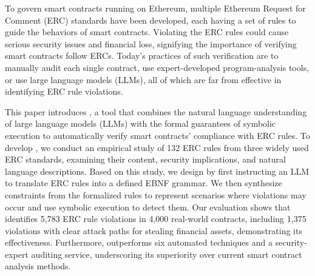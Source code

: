 
To govern smart contracts running on Ethereum, 
multiple Ethereum Request for Comment (ERC) standards have been developed, 
each having a set of rules to guide 
the behaviors of smart contracts. 
Violating the ERC rules could cause serious security issues 
and financial loss, 
signifying the importance of verifying 
smart contracts follow ERCs. 
Today's practices of such verification are to manually audit each single contract, 
use expert-developed program-analysis tools, or use large language models (LLMs), all of which are far from effective in identifying ERC rule violations.

This paper introduces \emph{\Tool{}}, 
a tool that combines the natural language understanding of large language models (LLMs) 
with the formal guarantees of symbolic execution to automatically 
verify smart contracts' compliance with ERC rules. To develop \Tool{}, 
we conduct an empirical study of 132 ERC rules from three widely 
used ERC standards, examining their content, security implications, 
and natural language descriptions. Based on this study, 
we design \Tool{} by first instructing an LLM to translate ERC 
rules into a defined EBNF grammar. We then synthesize constraints 
from the formalized rules to represent scenarios where violations 
may occur and use symbolic execution to detect them. 
Our evaluation shows that \Tool{} identifies 5,783 ERC rule violations 
in 4,000 real-world contracts, including 1,375 violations with 
clear attack paths for stealing financial assets, demonstrating its effectiveness. 
Furthermore, \Tool{} outperforms six automated techniques and a security-expert auditing service, underscoring its superiority over current 
smart contract analysis methods.








  

